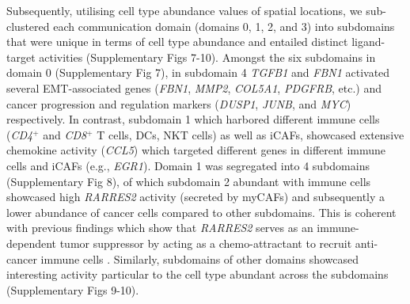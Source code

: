 

Subsequently, utilising cell type abundance values of spatial locations, we sub-clustered each communication domain (domains 0, 1, 2, and 3) into subdomains that were unique in terms of cell type abundance and entailed distinct ligand-target activities (Supplementary Figs 7-10). Amongst the six subdomains in domain 0 (Supplementary Fig 7), in subdomain 4 \textit{TGFB1} and \textit{FBN1} activated several EMT-associated genes (\textit{FBN1}, \textit{MMP2}, \textit{COL5A1}, \textit{PDGFRB}, etc.) \citep{10.1172/JCI45014} and cancer progression and regulation markers (\textit{DUSP1}, \textit{JUNB}, and \textit{MYC}) \citep{Tuglu2018, Lukey2016} respectively. In contrast, subdomain 1 which harbored different immune cells (\textit{CD4}$^{+}$ and \textit{CD8}$^{+}$ T cells, DCs, NKT cells) as well as iCAFs, showcased extensive chemokine activity (\textit{CCL5}) which targeted different genes in different immune cells and iCAFs (e.g., \textit{EGR1}). Domain 1 was segregated into 4 subdomains (Supplementary Fig 8), of which subdomain 2 abundant with immune cells showcased high \textit{RARRES2} activity (secreted by myCAFs) and subsequently a lower abundance of cancer cells compared to other subdomains. This is coherent with previous findings which show that \textit{RARRES2} serves as an immune-dependent tumor suppressor by acting as a chemo-attractant to recruit anti-cancer immune cells \citep{wittamer2003specific,wittamer2005neutrophil,zabel2005chemokine,vermi2005role}. Similarly, subdomains of other domains showcased interesting activity particular to the cell type abundant across the subdomains (Supplementary Figs 9-10). 

